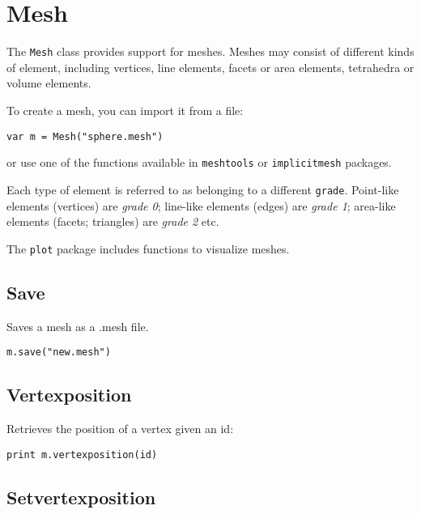 \hypertarget{mesh}{%
\section{Mesh}\label{mesh}}

The \texttt{Mesh} class provides support for meshes. Meshes may consist
of different kinds of element, including vertices, line elements, facets
or area elements, tetrahedra or volume elements.

To create a mesh, you can import it from a file:

\begin{lstlisting}
var m = Mesh("sphere.mesh")
\end{lstlisting}

or use one of the functions available in \texttt{meshtools} or
\texttt{implicitmesh} packages.

Each type of element is referred to as belonging to a different
\texttt{grade}. Point-like elements (vertices) are \emph{grade 0};
line-like elements (edges) are \emph{grade 1}; area-like elements
(facets; triangles) are \emph{grade 2} etc.

The \texttt{plot} package includes functions to visualize meshes.

\hypertarget{save}{%
\subsection{Save}\label{save}}

Saves a mesh as a .mesh file.

\begin{lstlisting}
m.save("new.mesh")
\end{lstlisting}

\hypertarget{vertexposition}{%
\subsection{Vertexposition}\label{vertexposition}}

Retrieves the position of a vertex given an id:

\begin{lstlisting}
print m.vertexposition(id)
\end{lstlisting}

\hypertarget{setvertexposition}{%
\subsection{Setvertexposition}\label{setvertexposition}}

